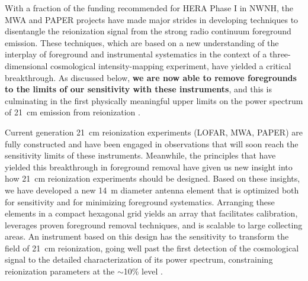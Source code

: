 \documentclass[preprint]{aastex}
\begin{document}
With a fraction of the funding recommended for HERA Phase I
in NWNH, the MWA and PAPER projects have made
major strides in developing techniques to disentangle
the reionization signal from the strong radio continuum foreground
emission.  These techniques, which are based on a new
understanding of the interplay of foreground and instrumental systematics
in the context of a three-dimensional cosmological intensity-mapping experiment,
have yielded a critical breakthrough.  As discussed below, {\bf we are now able to remove 
foregrounds to the limits of our sensitivity with these instruments},
and this is culminating in the first physically meaningful upper limits
on the power spectrum of 21~cm emission from reionization \citep{parsons_et_al2013}.

Current generation 21~cm reionization experiments (LOFAR, MWA, PAPER) are fully constructed and have been engaged in observations
that will soon reach the sensitivity limits of these instruments.  Meanwhile,
the principles that have yielded this breakthrough in foreground removal
have given us new insight into how
21~cm reionization experiments should be designed.  Based on these insights, we have developed a new 14~m diameter antenna element 
that is optimized both for
sensitivity and for minimizing foreground systematics.  
Arranging these elements in a compact hexagonal grid yields an array that
facilitates calibration, leverages proven foreground removal techniques, and is scalable
to large collecting areas.
An instrument based on this design has the sensitivity to transform the field of 21~cm reionization,
going well past the first detection of the cosmological signal to the detailed characterization of 
its power spectrum, constraining reionization parameters at the $\sim$10\% level \citep{pober_et_al2014}.
\end{document}
